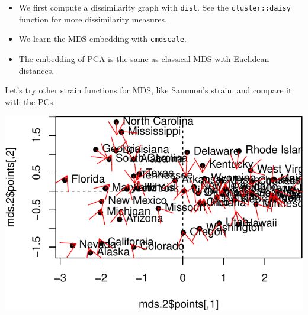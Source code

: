 \documentclass[]{book}
\newenvironment{Shaded}{\begin{snugshade}}{\end{snugshade}}
\newcommand{\KeywordTok}[1]{\textcolor[rgb]{0.13,0.29,0.53}{\textbf{#1}}}
\newcommand{\DataTypeTok}[1]{\textcolor[rgb]{0.13,0.29,0.53}{#1}}
\newcommand{\DecValTok}[1]{\textcolor[rgb]{0.00,0.00,0.81}{#1}}
\newcommand{\FloatTok}[1]{\textcolor[rgb]{0.00,0.00,0.81}{#1}}
\newcommand{\StringTok}[1]{\textcolor[rgb]{0.31,0.60,0.02}{#1}}
\newcommand{\CommentTok}[1]{\textcolor[rgb]{0.56,0.35,0.01}{\textit{#1}}}
\newcommand{\OtherTok}[1]{\textcolor[rgb]{0.56,0.35,0.01}{#1}}
\newcommand{\OperatorTok}[1]{\textcolor[rgb]{0.81,0.36,0.00}{\textbf{#1}}}
\newcommand{\NormalTok}[1]{#1}
\providecommand{\tightlist}{%
  \setlength{\itemsep}{0pt}\setlength{\parskip}{0pt}}
\theoremstyle{definition}
\theoremstyle{definition}
\theoremstyle{definition}
\theoremstyle{remark}
\begin{document}
\begin{itemize}
\tightlist
\item
  We first compute a dissimilarity graph with \texttt{dist}. See the
  \texttt{cluster::daisy} function for more dissimilarity measures.
\item
  We learn the MDS embedding with \texttt{cmdscale}.
\item
  The embedding of PCA is the same as classical MDS with Euclidean
  distances.
\end{itemize}

Let's try other strain functions for MDS, like Sammon's strain, and
compare it with the PCs.

\begin{Shaded}
\end{Shaded}

\includegraphics[width=0.5\linewidth]{Rcourse_files/figure-latex/SammonMDS-1}
\end{document}
